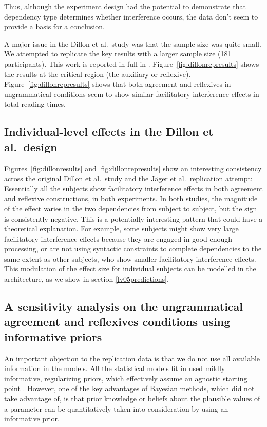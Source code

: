 \documentclass{cambridge7A}\usepackage[]{graphicx}\usepackage[]{color}
\begin{document}
Thus, although the experiment design had the potential to demonstrate that dependency type determines whether interference occurs, the data don't seem to provide a basis for a conclusion. 

A major issue in the Dillon et al.\ study was that the sample size was quite small. 
We attempted to replicate the key results with a larger sample size (181 participants). This work is reported in full in \cite{JaegerMertzenVanDykeVasishth2019}.
Figure~\ref{fig:dillonrepresults} shows the results at the critical region (the auxiliary or reflexive). Figure~\ref{fig:dillonrepresults} shows that both agreement and reflexives in ungrammatical conditions seem to show similar  facilitatory interference effects in total reading times.

\subsection{Individual-level effects in the Dillon et al.\ design}

Figures~\ref{fig:dillonresults} and \ref{fig:dillonrepresults} show an interesting consistency across the original Dillon et al.\ study and the J\"ager et al.\ replication attempt: Essentially all the subjects show facilitatory interference effects in both agreement and reflexive constructions, in both experiments. In both studies, the magnitude of the effect varies in the two dependencies from subject to subject, but the sign is consistently negative. This is a potentially interesting pattern that could have a theoretical explanation. For example, some subjects might show very large facilitatory interference effects because  they are engaged in  good-enough processing, or are not using syntactic constraints to complete dependencies to the same extent as other subjects, who show smaller facilitatory interference effects. This modulation of the effect size for individual subjects can be modelled in the \cite{LewisVasishth2005} architecture, as we show in section \ref{lv05predictions}.

\subsection{A sensitivity analysis on the ungrammatical agreement and reflexives conditions using informative priors}

An important objection to the replication data is that we do not use all available information in the models.
All the statistical models fit in \cite{JaegerMertzenVanDykeVasishth2019} used  mildly informative,  regularizing priors, which effectively assume an agnostic starting point \citep{SchadEtAlWorkflow}. However, one of the key advantages of  Bayesian methods, which \cite{JaegerMertzenVanDykeVasishth2019} did not take advantage of, is that  prior knowledge or beliefs about the plausible values of a parameter can be quantitatively taken into consideration by using an informative prior. 
\end{document}
